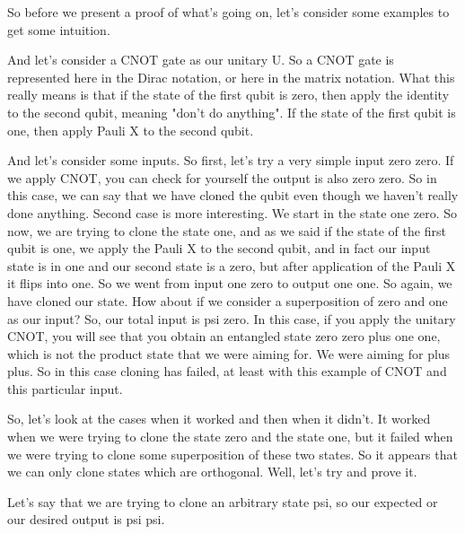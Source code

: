 So before we present a proof of what's going on, let's consider some examples to get some intuition.

And let's consider a CNOT gate as our unitary U. So a CNOT gate is represented here in the Dirac notation, or here in the matrix notation. What this really means is that if the state of the first qubit is zero, then apply the identity to the second qubit, meaning "don't do anything". If the state of the first qubit is one, then apply Pauli X to the second qubit.

And let's consider some inputs. So first, let's try a very simple input zero zero. If we apply CNOT, you can check for yourself the output is also zero zero. So in this case, we can say that we have cloned the qubit even though we haven't really done anything. Second case is more interesting. We start in the state one zero. So now, we are trying to clone the state one, and as we said if the state of the first qubit is one, we apply the Pauli X to the second qubit, and in fact our input state is in one and our second state is a zero, but after application of the Pauli X it flips into one. So we went from input one zero to output one one. So again, we have cloned our state. How about if we consider a superposition of zero and one as our input? So, our total input is psi zero. In this case, if you apply the unitary CNOT, you will see that you obtain an entangled state zero zero plus one one, which is not the product state that we were aiming for. We were aiming for plus plus. So in this case cloning has failed, at least with this example of CNOT and this particular input.

So, let's look at the cases when it worked and then when it didn't. It worked when we were trying to clone the state zero and the state one, but it failed when we were trying to clone some superposition of these two states. So it appears that we can only clone states which are orthogonal. Well, let's try and prove it.

Let's say that we are trying to clone an arbitrary state psi, so our expected or our desired output is psi psi.

